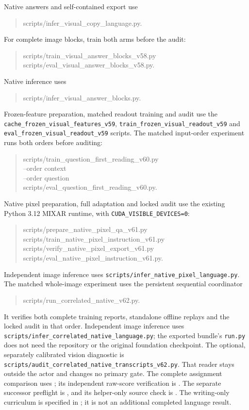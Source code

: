 \documentclass[10pt,a4paper]{article}
\begin{document}
Native answers and self-contained export use
\begin{quote}\small\ttfamily
scripts/infer\_visual\_copy\_language.py.
\end{quote}
For complete image blocks, train both arms before the audit:
\begin{quote}\small\ttfamily
scripts/train\_visual\_answer\_blocks\_v58.py\\
scripts/eval\_visual\_answer\_blocks\_v58.py.
\end{quote}
Native inference uses
\begin{quote}\small\ttfamily
scripts/infer\_visual\_answer\_blocks.py.
\end{quote}
Frozen-feature preparation, matched readout training and audit use the
\texttt{cache\_frozen\_visual\_features\_v59},
\texttt{train\_frozen\_visual\_readout\_v59} and
\texttt{eval\_frozen\_visual\_readout\_v59} scripts.
The matched input-order experiment runs both orders before auditing:
\begin{quote}\small\ttfamily
scripts/train\_question\_first\_reading\_v60.py\\
--order context\\
--order question\\
scripts/eval\_question\_first\_reading\_v60.py.
\end{quote}
Native pixel preparation, full adaptation and locked audit use the existing
Python 3.12 MIXAR runtime, with \texttt{CUDA\_VISIBLE\_DEVICES=0}:
\begin{quote}\small\ttfamily
scripts/prepare\_native\_pixel\_qa\_v61.py\\
scripts/train\_native\_pixel\_instruction\_v61.py\\
scripts/verify\_native\_pixel\_export\_v61.py\\
scripts/eval\_native\_pixel\_instruction\_v61.py.
\end{quote}
Independent image inference uses
\texttt{scripts/infer\_native\_pixel\_language.py}.
The matched whole-image experiment uses the persistent sequential coordinator
\begin{quote}\small\ttfamily
scripts/run\_correlated\_native\_v62.py.
\end{quote}
It verifies both complete training reports, standalone offline replays and
the locked audit in that order. Independent image inference uses
\texttt{scripts/infer\_correlated\_native\_language.py};
the exported bundle's \texttt{run.py} does not need the repository or the
original foundation checkpoint. The optional, separately calibrated vision
diagnostic is \texttt{scripts/audit\_correlated\_native\_transcripts\_v62.py}.
That reader stays outside the actor and changes no primary gate.
The complete assignment comparison uses
; its independent raw-score
verification is .
The separate successor preflight is ,
and its helper-only source check is .
The writing-only curriculum is specified in
; it is not an
additional completed language result.
\end{document}
